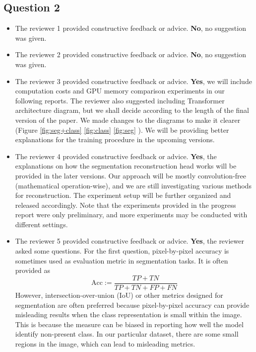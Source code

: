 \documentclass[rebuttal]{cvpr}
\begin{document}
\subsection{Question 2}
\begin{itemize}
    \item The reviewer 1 provided constructive feedback or advice. \textbf{No}, no suggestion was given.
    
    \item The reviewer 2 provided constructive feedback or advice.
    \textbf{No}, no suggestion was given.
    
    \item The reviewer 3 provided constructive feedback or advice. \textbf{Yes}, we will include computation costs and GPU memory comparison experiments in our following reports. The reviewer also suggested including Transformer architecture diagram, but we shall decide according to the length of the final version of the paper. We made changes to the diagrams to make it clearer (Figure \ref{fig:seg+class} \ref{fig:class} \ref{fig:seg} ). We will be providing better explanations for the training procedure in the upcoming versions.
    
    \item The reviewer 4 provided constructive feedback or advice. \textbf{Yes}, the explanations on how the segmentation reconstruction head works will be provided in the later versions. Our approach will be mostly convolution-free (mathematical operation-wise), and we are still investigating various methods for reconstruction. The experiment setup will be further organized and released accordingly. Note that the experiments provided in the progress report were only preliminary, and more experiments may be conducted with different settings.
    
    \item The reviewer 5 provided constructive feedback or advice. \textbf{Yes}, the reviewer asked some questions. For the first question, pixel-by-pixel accuracy is sometimes used as evaluation metric in segmentation tasks. It is often provided as 
    \[ \text{Acc} := \frac{TP + TN}{TP + TN + FP + FN} \]
    However, intersection-over-union (IoU) or other metrics designed for segmentation are often preferred because pixel-by-pixel accuracy can provide misleading results when the class representation is small within the image. This is because the measure can be biased in reporting how well the model identify non-present class. In our particular dataset, there are some small regions in the image, which can lead to misleading metrics. 
    

\end{itemize}
\end{document}
